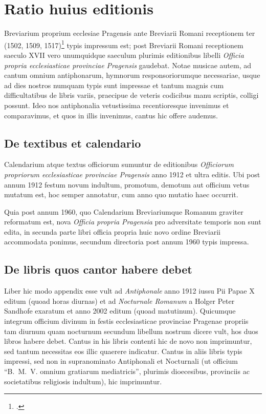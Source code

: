 \chapter*{Ratio huius editionis}

Breviarium proprium ecclesiae Pragensis
ante Breviarii Romani receptionem ter
(1502, 1509, 1517)\footcite[242]{bohatta}
typis impressum est; post Breviarii Romani receptionem
saeculo XVII vero unumquidque saeculum plurimis editionibus
libelli \emph{Officia propria ecclesiasticae provinciae Pragensis} gaudebat.
Notae musicae autem, ad cantum omnium antiphonarum, hymnorum
responsoriorumque necessariae,
usque ad dies nostros numquam typis sunt impressae
et tantum magnis cum difficultatibus de libris variis,
praecipue de veteris codicibus manu scriptis,
colligi possunt. Ideo nos antiphonalia vetustissima recentioresque
invenimus et comparavimus, et quos in illis invenimus,
cantus hic offere audemus.

\section*{De textibus et calendario}
Calendarium atque textus officiorum sumuntur de editionibus
\emph{Officiorum propriorum ecclesiasticae provinciae Pragensis}
anno 1912 et ultra editis.
Ubi post annum 1912 festum novum indultum, promotum, demotum
aut officium vetus mutatum est, hoc semper annotatur,
cum anno quo mutatio haec occurrit.

Quia post annum 1960, quo Calendarium Breviariumque Romanum
graviter reformatum est, nova \emph{Officia propria Pragensia}
pro adversitate temporis non sunt edita,
in secunda parte libri officia propria huic novo ordine Breviarii
accommodata ponimus, secundum directoria post annum 1960 typis
impressa.

\section*{De libris quos cantor habere debet}
Liber hic modo appendix esse vult ad \emph{Antiphonale}
anno 1912 iussu Pii Papae X editum (quoad horas diurnas) et
ad \emph{Nocturnale Romanum} a Holger Peter Sandhofe exaratum
et anno 2002 editum (quoad matutinum).
Quicumque integrum officium divinum in festis ecclesiasticae provinciae
Pragenae propriis tam diurnum quam nocturnum secundum
libellum nostrum dicere vult, hos duos libros habere debet.
Cantus in his libris contenti hic de novo non imprimuntur,
sed tantum necessitas eos illic quaerere indicatur.
Cantus in aliis libris typis impressi, sed non in supranominato
Antiphonali et Nocturnali (ut officium
\enquote{B.~M.~V. omnium gratiarum mediatricis}, plurimis dioecesibus,
provinciis ac societatibus religiosis indultum), hic imprimuntur.

